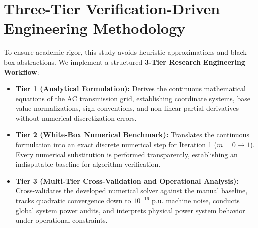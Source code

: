 \documentclass[12pt,a4paper,oneside]{report}
\begin{document}
\section{Three-Tier Verification-Driven Engineering Methodology}
To ensure academic rigor, this study avoids heuristic approximations and black-box abstractions. We implement a structured \textbf{3-Tier Research Engineering Workflow}:
\begin{itemize}
    \item \textbf{Tier 1 (Analytical Formulation):} Derives the continuous mathematical equations of the AC transmission grid, establishing coordinate systems, base value normalizations, sign conventions, and non-linear partial derivatives without numerical discretization errors.
    \item \textbf{Tier 2 (White-Box Numerical Benchmark):} Translates the continuous formulation into an exact discrete numerical step for Iteration 1 ($m = 0 \to 1$). Every numerical substitution is performed transparently, establishing an indisputable baseline for algorithm verification.
    \item \textbf{Tier 3 (Multi-Tier Cross-Validation and Operational Analysis):} Cross-validates the developed numerical solver against the manual baseline, tracks quadratic convergence down to $10^{-16}\text{ p.u.}$ machine noise, conducts global system power audits, and interprets physical power system behavior under operational constraints.
\end{itemize}
\end{document}
